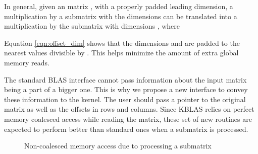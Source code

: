 In general, given an  matrix , with a properly padded leading dimension, a multiplication by a 
submatrix  with the dimensions  can 
be translated into a multiplication by the submatrix  with dimensions , where 

 

Equation \ref{eqn:offset_dim} shows that the dimensions  and  are padded to the nearest values divisible by . This helps 
minimize the amount of extra global memory reads. 

The standard BLAS interface cannot pass information about the input matrix being a part of a bigger one. This is why we propose a new interface 
to convey these information to the kernel. The user should pass a pointer to the original matrix 
as well as the offsets in rows and columns. Since KBLAS relies on perfect memory coalesced access while reading the matrix, 
these set of new routines are expected to perform better than standard ones when a submatrix is processed.

\begin{figure}[ht]
\centering
{}
\caption[]{Non-coalesced memory access due to processing a submatrix}
\label{fig:submatrix}
\end{figure}
